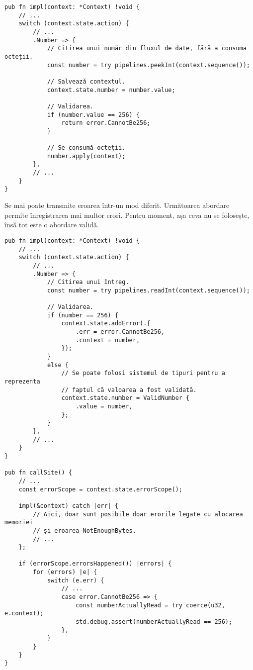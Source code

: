 \documentclass[a4paper,12pt]{report}
\begin{document}
\begin{verbatim}
pub fn impl(context: *Context) !void {
    // ...
    switch (context.state.action) {
        // ...
        .Number => {
            // Citirea unui număr din fluxul de date, fără a consuma octeții.
            const number = try pipelines.peekInt(context.sequence());

            // Salvează contextul.
            context.state.number = number.value;

            // Validarea.
            if (number.value == 256) {
                return error.CannotBe256;
            }

            // Se consumă octeții.
            number.apply(context);
        },
        // ...
    }
}
\end{verbatim}

Se mai poate transmite eroarea într-un mod diferit.
Următoarea abordare permite înregistrarea mai multor erori.
Pentru moment, așa ceva nu se folosește, însă tot este o abordare validă.

\begin{verbatim}
pub fn impl(context: *Context) !void {
    // ...
    switch (context.state.action) {
        // ...
        .Number => {
            // Citirea unui întreg.
            const number = try pipelines.readInt(context.sequence());

            // Validarea.
            if (number == 256) {
                context.state.addError(.{
                    .err = error.CannotBe256,
                    .context = number,
                });
            }
            else {
                // Se poate folosi sistemul de tipuri pentru a reprezenta
                // faptul că valoarea a fost validată.
                context.state.number = ValidNumber {
                    .value = number,
                };
            }
        },
        // ...
    }
}

pub fn callSite() {
    // ... 
    const errorScope = context.state.errorScope();

    impl(&context) catch |err| {
        // Aici, doar sunt posibile doar erorile legate cu alocarea memoriei
        // și eroarea NotEnoughBytes.
        // ...
    };

    if (errorScope.errorsHappened()) |errors| {
        for (errors) |e| {
            switch (e.err) {
                // ...
                case error.CannotBe256 => {
                    const numberActuallyRead = try coerce(u32, e.context);
                    std.debug.assert(numberActuallyRead == 256);
                },
            }
        }
    }
}
\end{verbatim}
\end{document}
